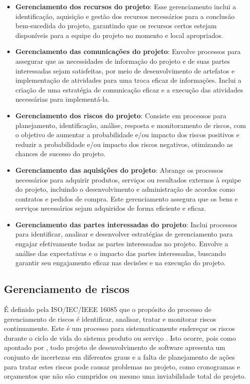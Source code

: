 \documentclass[
	12pt,
	openright,
	twoside,
	a4paper,
	english,
	brazil
	]{abntex2}
\begin{document}
\begin{itemize}
  \item \textbf{Gerenciamento dos recursos do projeto}:  Esse gerenciamento inclui a identificação, aquisição e gestão dos recursos necessários para a conclusão bem-sucedida do projeto, garantindo que os recursos certos estejam disponíveis para a equipe do projeto no momento e local apropriados.
  \item \textbf{Gerenciamento das comunicações do projeto}: Envolve processos para assegurar que as necessidades de informação do projeto e de suas partes interessadas sejam satisfeitas, por meio de desenvolvimento de artefatos e implementação de atividades para uma troca eficaz de informações. Inclui a criação de uma estratégia de comunicação eficaz e a execução das atividades necessárias para implementá-la.
  \item \textbf{Gerenciamento dos riscos do projeto}: Consiste em processos para planejamento, identificação, análise, resposta e monitoramento de riscos, com o objetivo de aumentar a probabilidade e/ou impacto dos riscos positivos e reduzir a probabilidade e/ou impacto dos riscos negativos, otimizando as chances de sucesso do projeto.
  \item \textbf{Gerenciamento das aquisições do projeto}: Abrange os processos necessários para adquirir produtos, serviços ou resultados externos à equipe do projeto, incluindo o desenvolvimento e administração de acordos como contratos e pedidos de compra. Este gerenciamento assegura que os bens e serviços necessários sejam adquiridos de forma eficiente e eficaz.
  \item \textbf{Gerenciamento das partes interessadas do projeto}: Inclui processos para identificar, analisar e desenvolver estratégias de gerenciamento para engajar efetivamente todas as partes interessadas no projeto. Envolve a análise das expectativas e o impacto das partes interessadas, buscando garantir seu engajamento eficaz nas decisões e na execução do projeto.
\end{itemize}


\subsection{Gerenciamento de riscos}

É definido pela ISO/IEC/IEEE 16085 que o propósito do processo de gerenciamento de riscos é identificar, analisar, tratar e monitorar riscos continuamente. Este é um processo para sistematicamente endereçar os riscos durante o ciclo de vida do sistema produto ou serviço \cite{iso16085}. Isto ocorre, pois como apontado por , todo projeto de desenvolvimento de software apresenta um conjunto de incertezas em diferentes graus e a falta de planejamento de ações para tratar estes riscos pode causar problemas no projeto, como cronogramas e orçamentos que não são cumpridos ou mesmo uma inviabilidade total do projeto.
\end{document}
